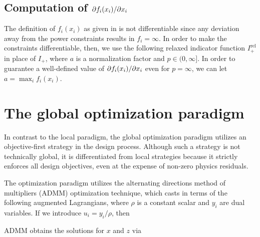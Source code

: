 \subsection{Computation of $\partial f_i(x_i) / \partial x_i$}
The definition of $f_i(x_i)$ as given in  is not differentiable 
    since any deviation away from the power constraints results in $f_i = \infty$.
In order to make the constraints differentiable, then, 
    we use the following relaxed indicator function $I^\text{rel}_+$ in place of $I_+$,
    where $a$ is a normalization factor and $p \in (0, \infty]$. 
In order to guarantee a well-defined value of $\partial f_i(x_i) / \partial x_i$ even for $p = \infty$,
    we can let $a = \max_i f_i(x_i)$.



\section{The global optimization paradigm}
In contrast to the local paradigm, 
    the global optimization paradigm utilizes an objective-first strategy
    in the design process.
Although such a strategy is not technically global,
    it is differentiated from local strategies because
    it strictly enforces all design objectives,
    even at the expense of non-zero physics residuals.

The optimization paradigm utilizes 
    the alternating directions method of multipliers\cite{ADMM} (ADMM) optimization technique, 
    which casts  in terms of the following augmented Lagrangians, 
    where $\rho$ is a constant scalar and 
    $y_i$ are dual variables. If we introduce $u_i = y_i / \rho$, then 

ADMM obtains the solutions for $x$ and $z$ via

